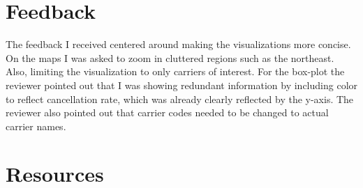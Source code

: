 \documentclass[a4paper,11pt]{report}
\begin{document}
\section{Feedback}
The feedback I received centered around making the visualizations more concise.
On the maps I was asked to zoom in cluttered regions such as the
northeast.  Also, limiting the visualization to only carriers of interest.  For
the box-plot the reviewer pointed out that I was showing redundant information by
including color to reflect cancellation rate, which was already clearly
reflected by the y-axis.  The reviewer also pointed out that carrier codes
needed to be changed to actual carrier names.

\section{Resources}
\end{document}
